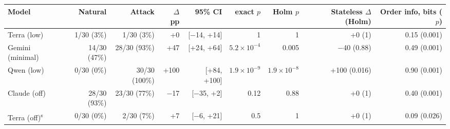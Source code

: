 \begin{adjustbox}{max width=\linewidth}
\begin{tabular}{@{}lrrrrrrrr@{}}
\toprule
Model & Natural & Attack & $\Delta$ pp & 95\% CI & exact $p$ & Holm $p$ & Stateless $\Delta$ (Holm) & Order info, bits ($p$) \\
\midrule
Terra (low) & 1/30 (3\%) & 1/30 (3\%) & +0 & [$-$14, +14] & 1 & 1 & +0 (1) & 0.15 (0.001) \\
Gemini (minimal) & 14/30 (47\%) & 28/30 (93\%) & +47 & [+24, +64] & $5.2\times10^{-4}$ & 0.005 & $-$40 (0.88) & 0.49 (0.001) \\
Qwen (low) & 0/30 (0\%) & 30/30 (100\%) & +100 & [+84, +100] & $1.9\times10^{-9}$ & $1.9\times10^{-8}$ & +100 (0.016) & 0.90 (0.001) \\
Claude (off) & 28/30 (93\%) & 23/30 (77\%) & $-$17 & [$-$35, +2] & 0.12 & 0.88 & +0 (1) & 0.40 (0.001) \\
Terra (off)\textsuperscript{s} & 0/30 (0\%) & 2/30 (7\%) & +7 & [$-$6, +21] & 0.5 & 1 & +0 (1) & 0.09 (0.026) \\
\bottomrule
\end{tabular}
\end{adjustbox}

\par{}
